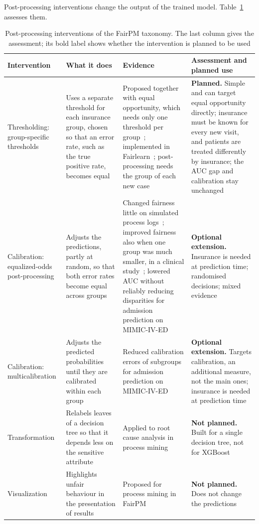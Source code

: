 Post-processing interventions change the output of the trained model. Table~\ref{table::postprocessing} assesses them.

\begin{table}[htbp]
  \centering
  \footnotesize
  \caption{Post-processing interventions of the FairPM taxonomy. The last column gives the assessment; its bold label shows whether the intervention is planned to be used}\label{table::postprocessing}
  \begin{tabularx}{\textwidth}{@{}>{\raggedright\arraybackslash}p{2.5cm}>{\raggedright\arraybackslash}X>{\raggedright\arraybackslash}X>{\raggedright\arraybackslash}X@{}}
    \toprule
    \textbf{Intervention} & \textbf{What it does} & \textbf{Evidence} & \textbf{Assessment and planned use} \\
    \midrule
    Thresholding: group-specific thresholds & Uses a separate threshold for each insurance group, chosen so that an error rate, such as the true positive rate, becomes equal & Proposed together with equal opportunity, which needs only one threshold per group~\cite{hardt2016equality}; implemented in Fairlearn~\cite{weerts2023fairlearn}; post-processing needs the group of each new case~\cite{hardt2016equality,agarwal2018reductions,cruz2023fairgbm} & \textbf{Planned.} Simple and can target equal opportunity directly; insurance must be known for every new visit, and patients are treated differently by insurance; the AUC gap and calibration stay unchanged \\ \addlinespace[0.8ex]
    Calibration: equalized-odds post-processing & Adjusts the predictions, partly at random, so that both error rates become equal across groups & Changed fairness little on simulated process logs~\cite{dasilva2025towards}; improved fairness also when one group was much smaller, in a clinical study~\cite{sanchezmarques2026addressing}; lowered AUC without reliably reducing disparities for admission prediction on MIMIC-IV-ED~\cite{liu2024faim} & \textbf{Optional extension.} Insurance is needed at prediction time; randomised decisions; mixed evidence \\ \addlinespace[0.8ex]
    Calibration: multicalibration & Adjusts the predicted probabilities until they are calibrated within each group & Reduced calibration errors of subgroups for admission prediction on MIMIC-IV-ED~\cite{lett2025intersectional} & \textbf{Optional extension.} Targets calibration, an additional measure, not the main ones; insurance is needed at prediction time \\ \addlinespace[0.8ex]
    Transformation & Relabels leaves of a decision tree so that it depends less on the sensitive attribute & Applied to root cause analysis in process mining~\cite{qafari2019fairness} & \textbf{Not planned.} Built for a single decision tree, not for XGBoost \\ \addlinespace[0.8ex]
    Visualization & Highlights unfair behaviour in the presentation of results & Proposed for process mining in FairPM~\cite{revoredo2026fairpm} & \textbf{Not planned.} Does not change the predictions \\
    \bottomrule
  \end{tabularx}
\end{table}

